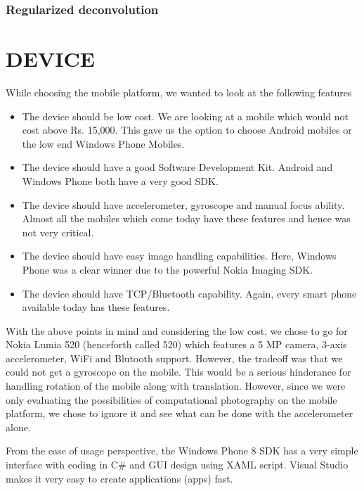 \documentclass[BTech]{iitmdiss}
\begin{document}
\subsection{Regularized deconvolution}
\label{basic_theory:deconv:reg}

\pagebreak
\chapter{DEVICE}
\label{chap:device}
While choosing the mobile platform, we wanted to look at the following
features
\begin{itemize}
\item The device should be low cost. We are looking at a mobile which
would not cost above Rs. 15,000. This gave us the option to choose 
Android mobiles or the low end Windows Phone Mobiles.
\item The device should have a good Software Development Kit. Android
and Windows Phone both have a very good SDK.
\item The device should have accelerometer, gyroscope and manual focus
ability. Almost all the mobiles which come today have these features 
and hence was not very critical.
\item The device should have easy image handling capabilities. Here, 
Windows Phone was a clear winner due to the powerful Nokia Imaging SDK.
\item The device should have TCP/Bluetooth capability. Again, every 
smart phone available today has these features. 
\end{itemize}
 
With the above points in mind and considering the low cost, we chose to
go for Nokia Lumia 520 (henceforth called 520) which features a 5 MP
camera, 3-axis accelerometer, WiFi and Blutooth support. However, the 
tradeoff was that we could not get a gyroscope on the mobile. This 
would be a serious hinderance for handling rotation of the mobile along
with translation. However, since we were only evaluating the 
possibilities of computational photography on the mobile platform, we
chose to ignore it and see what can be done with the accelerometer 
alone. 

From the ease of usage perspective, the Windows Phone 8 SDK has a very
simple interface with coding in C\# and GUI design using XAML script. 
Visual Studio makes it very easy to create applications (apps) fast.
\end{document}
